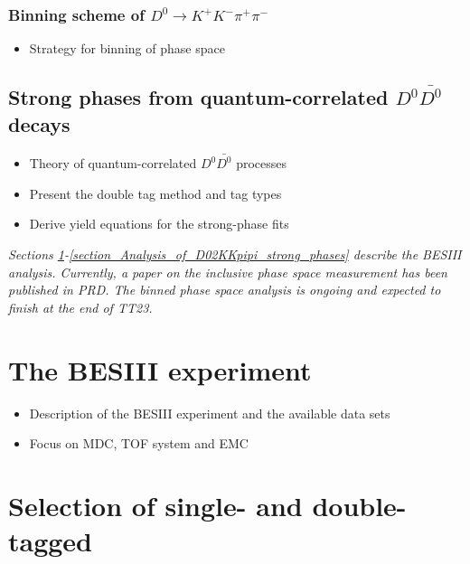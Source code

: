 \documentclass[12pt, a4paper, notitlepage, onecolumn]{article}
\begin{document}
\subsubsection{Binning scheme of \texorpdfstring{$D^0\to K^+K^-\pi^+\pi^-$}{D02KKpipi}}
  \begin{itemize}[nosep]
    \setlength{\itemindent}{2.5em}
    \item[\textasteriskcentered]{Strategy for binning of phase space}
  \end{itemize}
\subsection{Strong phases from quantum-correlated \texorpdfstring{$D^0\bar{D^0}$}{D0D0bar} decays}
  \begin{itemize}[nosep]
    \setlength{\itemindent}{2em}
    \item[\textendash]{Theory of quantum-correlated $D^0\bar{D^0}$ processes}
    \item[\textendash]{Present the double tag method and tag types}
    \item[\textendash]{Derive yield equations for the strong-phase fits}
  \end{itemize}
\leavevmode\newline
\textit{Sections \ref{section_The_BESIII_experiment}-\ref{section_Analysis_of_D02KKpipi_strong_phases} describe the BESIII analysis. Currently, a paper on the inclusive phase space measurement has been published in PRD. The binned phase space analysis is ongoing and expected to finish at the end of TT23.}
\section{The BESIII experiment}
\label{section_The_BESIII_experiment}
  \begin{itemize}[nosep]
    \setlength{\itemindent}{0em}
    \item{Description of the BESIII experiment and the available data sets}
    \item{Focus on MDC, TOF system and EMC}
  \end{itemize}

\section{Selection of single- and double-tagged \texorpdfstring{}{D02KKpipi}}
\label{section_Selection_of_single_and_double_tag_D02KKpipi_events}
\end{document}
